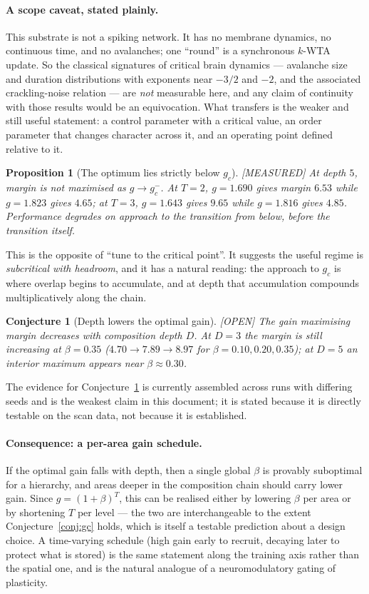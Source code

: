 \documentclass[11pt]{article}
\theoremstyle{definition}
\theoremstyle{plain}
\newtheorem{proposition}[lemma]{Proposition}
\newtheorem{conjecture}[lemma]{Conjecture}
\newcommand{\MEASURED}{\textnormal{\footnotesize\textsf{[MEASURED]}}}
\newcommand{\OPEN}{\textnormal{\footnotesize\textsf{[OPEN]}}}
\begin{document}
\paragraph{A scope caveat, stated plainly.} This substrate is not a spiking
network. It has no membrane dynamics, no continuous time, and no avalanches;
one ``round'' is a synchronous $k$-WTA update. So the classical signatures of
critical brain dynamics --- avalanche size and duration distributions with
exponents near $-3/2$ and $-2$, and the associated crackling-noise relation ---
are \emph{not} measurable here, and any claim of continuity with those results
would be an equivocation. What transfers is the weaker and still useful
statement: a control parameter with a critical value, an order parameter that
changes character across it, and an operating point defined relative to it.

\begin{proposition}[The optimum lies strictly below $g_c$]\label{prop:sub} \MEASURED
At depth $5$, margin is not maximised as $g \to g_c^-$. At $T=2$, $g=1.690$
gives margin $6.53$ while $g=1.823$ gives $4.65$; at $T=3$, $g=1.643$ gives
$9.65$ while $g=1.816$ gives $4.85$. Performance degrades on approach to the
transition from below, before the transition itself.
\end{proposition}

This is the opposite of ``tune to the critical point''. It suggests the useful
regime is \emph{subcritical with headroom}, and it has a natural reading: the
approach to $g_c$ is where overlap begins to accumulate, and at depth that
accumulation compounds multiplicatively along the chain.

\begin{conjecture}[Depth lowers the optimal gain]\label{conj:depth-gain} \OPEN
The gain maximising margin decreases with composition depth $D$. At $D=3$ the
margin is still increasing at $\beta=0.35$ ($4.70 \to 7.89 \to 8.97$ for
$\beta = 0.10, 0.20, 0.35$); at $D=5$ an interior maximum appears near
$\beta \approx 0.30$.
\end{conjecture}

The evidence for Conjecture~\ref{conj:depth-gain} is currently assembled across
runs with differing seeds and is the weakest claim in this document; it is
stated because it is directly testable on the scan data, not because it is
established.

\paragraph{Consequence: a per-area gain schedule.} If the optimal gain falls
with depth, then a single global $\beta$ is provably suboptimal for a
hierarchy, and areas deeper in the composition chain should carry lower gain.
Since $g=(1+\beta)^T$, this can be realised either by lowering $\beta$ per area
or by shortening $T$ per level --- the two are interchangeable to the extent
Conjecture~\ref{conj:gc} holds, which is itself a testable prediction about a
design choice. A time-varying schedule (high gain early to recruit, decaying
later to protect what is stored) is the same statement along the training axis
rather than the spatial one, and is the natural analogue of a
neuromodulatory gating of plasticity.
\end{document}
